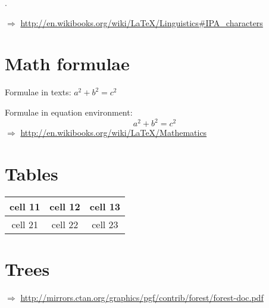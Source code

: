 \ex. 

$\Rightarrow$ \url{http://en.wikibooks.org/wiki/LaTeX/Linguistics#IPA_characters}

\section{Math formulae}

Formulae in texts: $a^2 + b^2 = c^2$

\noindent Formulae in equation environment:
\begin{equation}
a^2 + b^2 = c^2
\end{equation}
$\Rightarrow$ \url{http://en.wikibooks.org/wiki/LaTeX/Mathematics}

\section{Tables}

\begin{tabular}{c|c|c}
\hline
cell 11 & cell 12 & cell 13 \\
\hline
cell 21 & cell 22 & cell 23 \\
\hline
\end{tabular}

\section{Trees}


\noindent $\Rightarrow$ \url{http://mirrors.ctan.org/graphics/pgf/contrib/forest/forest-doc.pdf}
